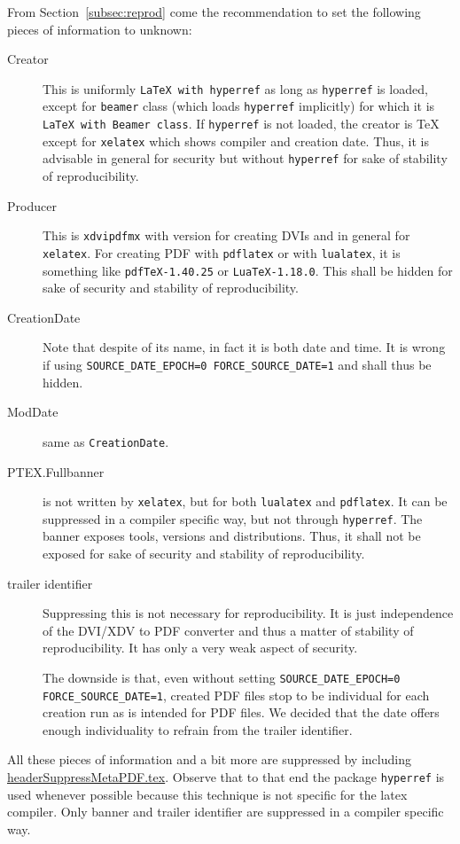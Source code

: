 \documentclass[a4paper, english]{article}%
\newcommand{\pdflatex}{\texttt{pdflatex}}
\newcommand{\lualatex}{\texttt{lualatex}}
\newcommand{\xelatex}{\texttt{xelatex}}
\begin{document}
From Section~\ref{subsec:reprod} come the recommendation 
to set the following pieces of information to unknown: 
%
\begin{description}
  \item[Creator] This is uniformly \texttt{LaTeX with hyperref} 
  as long as \texttt{hyperref} is loaded, except for \texttt{beamer} class 
  (which loads \texttt{hyperref} implicitly)
  for which it is \texttt{LaTeX with Beamer class}. 
  If \texttt{hyperref} is not loaded, 
  the creator is \TeX{} except for \xelatex{} which shows compiler and creation date. 
  Thus, it is advisable in general for security but without \texttt{hyperref} 
  for sake of stability of reproducibility. 
  \item[Producer] This is \texttt{xdvipdfmx} with version for creating DVIs 
  and in general for \xelatex. 
  For creating PDF with \pdflatex{} or with \lualatex, 
  it is something like \texttt{pdfTeX-1.40.25} or \texttt{LuaTeX-1.18.0}. 
  This shall be hidden for sake of security and stability of reproducibility. 
  \item[CreationDate] Note that despite of its name, in fact it is both date and time. 
  It is wrong if using \texttt{SOURCE\_DATE\_EPOCH=0 FORCE\_SOURCE\_DATE=1} 
  and shall thus be hidden. 
  \item[ModDate] same as \texttt{CreationDate}. 
  \item[PTEX.Fullbanner] is not written by \xelatex, 
  but for both \lualatex{} and \pdflatex. 
  It can be suppressed in a compiler specific way, 
  but not through \texttt{hyperref}. 
  The banner exposes tools, versions and distributions. 
  Thus, it shall not be exposed for sake of security and stability of reproducibility. 
  \item[trailer identifier]
  Suppressing this is not necessary for reproducibility. 
  It is just independence of the DVI/XDV to PDF converter 
  and thus a matter of stability of reproducibility. 
  It has only a very weak aspect of security. 
  
  The downside is that, 
  even without setting \texttt{SOURCE\_DATE\_EPOCH=0 FORCE\_SOURCE\_DATE=1}, 
  created PDF files stop to be individual for each creation run 
  as is intended for PDF files. 
  We decided that the date offers enough individuality 
  to refrain from the trailer identifier. 
\end{description}

All these pieces of information 
and a bit more are suppressed 
by including \href{\urlSite fromTex/headerSuppressMetaPDF.tex}{headerSuppressMetaPDF.tex}. 
Observe that to that end the package \texttt{hyperref} is used 
whenever possible because this technique is not specific for the latex compiler. 
Only banner and trailer identifier are suppressed in a compiler specific way. 
\end{document}
